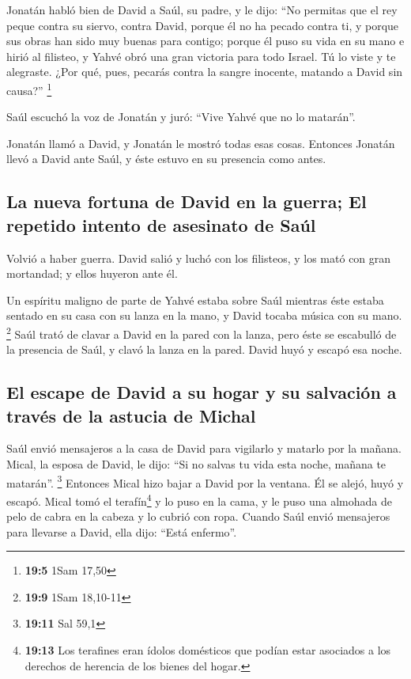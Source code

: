 Jonatán habló bien de David a Saúl, su padre, y le dijo:
``No permitas que el rey peque contra su siervo, contra David, porque él
no ha pecado contra ti, y porque sus obras han sido muy buenas para
contigo;  porque él puso su vida en su mano e hirió al
filisteo, y Yahvé obró una gran victoria para todo Israel. Tú lo viste y
te alegraste. ¿Por qué, pues, pecarás contra la sangre inocente, matando
a David sin causa?'' \footnote{\textbf{19:5} 1Sam 17,50}

 Saúl escuchó la voz de Jonatán y juró: ``Vive Yahvé que
no lo matarán''.

 Jonatán llamó a David, y Jonatán le mostró todas esas
cosas. Entonces Jonatán llevó a David ante Saúl, y éste estuvo en su
presencia como antes.

\hypertarget{la-nueva-fortuna-de-david-en-la-guerra-el-repetido-intento-de-asesinato-de-sauxfal}{%
\subsection{La nueva fortuna de David en la guerra; El repetido intento
de asesinato de
Saúl}\label{la-nueva-fortuna-de-david-en-la-guerra-el-repetido-intento-de-asesinato-de-sauxfal}}

 Volvió a haber guerra. David salió y luchó con los
filisteos, y los mató con gran mortandad; y ellos huyeron ante él.

 Un espíritu maligno de parte de Yahvé estaba sobre Saúl
mientras éste estaba sentado en su casa con su lanza en la mano, y David
tocaba música con su mano. \footnote{\textbf{19:9} 1Sam 18,10-11}
 Saúl trató de clavar a David en la pared con la lanza,
pero éste se escabulló de la presencia de Saúl, y clavó la lanza en la
pared. David huyó y escapó esa noche.

\hypertarget{el-escape-de-david-a-su-hogar-y-su-salvaciuxf3n-a-travuxe9s-de-la-astucia-de-michal}{%
\subsection{El escape de David a su hogar y su salvación a través de la
astucia de
Michal}\label{el-escape-de-david-a-su-hogar-y-su-salvaciuxf3n-a-travuxe9s-de-la-astucia-de-michal}}

 Saúl envió mensajeros a la casa de David para vigilarlo
y matarlo por la mañana. Mical, la esposa de David, le dijo: ``Si no
salvas tu vida esta noche, mañana te matarán''. \footnote{\textbf{19:11}
  Sal 59,1}  Entonces Mical hizo bajar a David por la
ventana. Él se alejó, huyó y escapó.  Mical tomó el
terafín\footnote{\textbf{19:13} Los terafines eran ídolos domésticos que
  podían estar asociados a los derechos de herencia de los bienes del
  hogar.} y lo puso en la cama, y le puso una almohada de pelo de cabra
en la cabeza y lo cubrió con ropa.  Cuando Saúl envió
mensajeros para llevarse a David, ella dijo: ``Está enfermo''.

